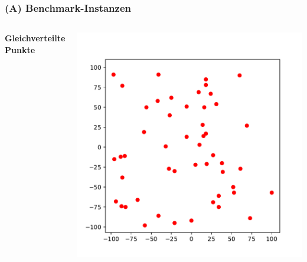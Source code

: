 \documentclass[aspectratio=169]{beamer}
\begin{document}
\begin{frame}
	\frametitle{(A) Benchmark-Instanzen}
	\begin{columns}[c] %
	
	\textbf{Gleichverteilte Punkte}
	
	\includegraphics[scale=.5]{random_50.pdf}
	

	\end{columns}
	\end{frame}

\end{document}
